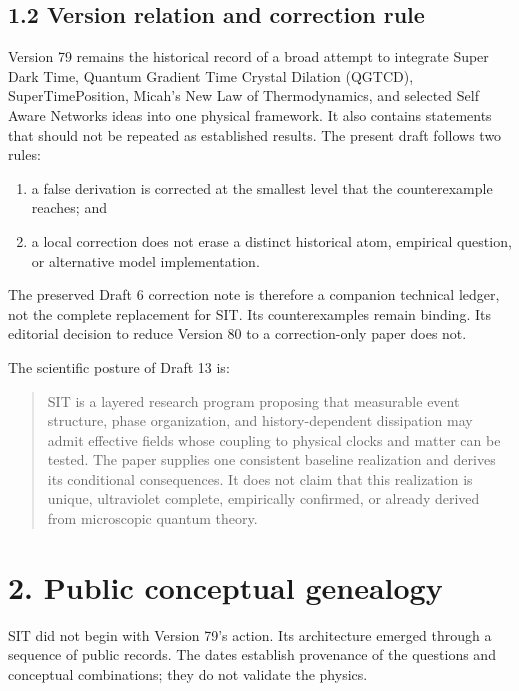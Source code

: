 \documentclass[
  american,
  11pt,
  letterpaper,
]{article}
\providecommand{\tightlist}{%
  \setlength{\itemsep}{0pt}\setlength{\parskip}{0pt}}
\begin{document}
\subsection{1.2 Version relation and correction rule}\label{version-relation-and-correction-rule}

Version 79 remains the historical record of a broad attempt to integrate Super Dark Time, Quantum Gradient Time Crystal Dilation (QGTCD), SuperTimePosition, Micah's New Law of Thermodynamics, and selected Self Aware Networks ideas into one physical framework. It also contains statements that should not be repeated as established results. The present draft follows two rules:

\begin{enumerate}
\def\labelenumi{\arabic{enumi}.}
\tightlist
\item
  a false derivation is corrected at the smallest level that the counterexample reaches; and
\item
  a local correction does not erase a distinct historical atom, empirical question, or alternative model implementation.
\end{enumerate}

The preserved Draft 6 correction note is therefore a companion technical ledger, not the complete replacement for SIT. Its counterexamples remain binding. Its editorial decision to reduce Version 80 to a correction-only paper does not.

The scientific posture of Draft 13 is:

\begin{quote}
SIT is a layered research program proposing that measurable event structure, phase organization, and history-dependent dissipation may admit effective fields whose coupling to physical clocks and matter can be tested. The paper supplies one consistent baseline realization and derives its conditional consequences. It does not claim that this realization is unique, ultraviolet complete, empirically confirmed, or already derived from microscopic quantum theory.
\end{quote}

\section{2. Public conceptual genealogy}\label{public-conceptual-genealogy}

SIT did not begin with Version 79's action. Its architecture emerged through a sequence of public records. The dates establish provenance of the questions and conceptual combinations; they do not validate the physics.
\end{document}
